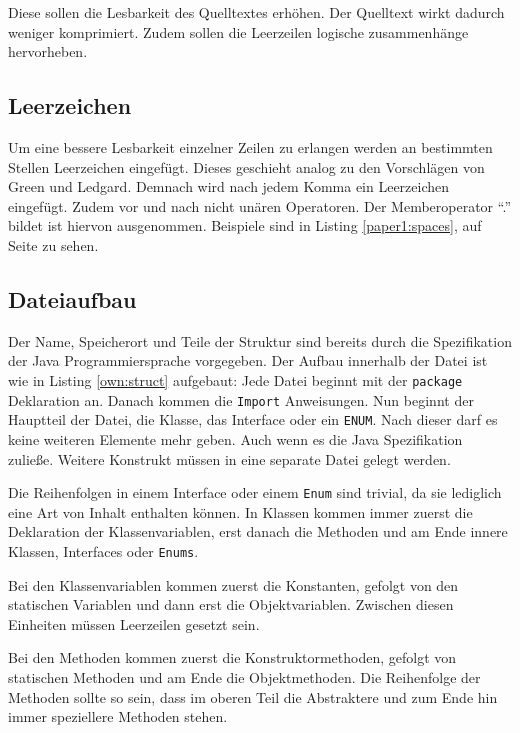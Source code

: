 Diese sollen die Lesbarkeit des Quelltextes erhöhen. Der Quelltext wirkt dadurch weniger komprimiert. Zudem sollen die Leerzeilen logische zusammenhänge hervorheben.

\subsection{Leerzeichen}

Um eine bessere Lesbarkeit einzelner Zeilen zu erlangen werden an bestimmten Stellen Leerzeichen eingefügt. Dieses geschieht analog zu den Vorschlägen von Green und Ledgard\cite[S. 7]{Green}. Demnach wird nach jedem Komma ein Leerzeichen eingefügt. Zudem vor und nach nicht unären Operatoren. Der Memberoperator \enquote{.} bildet ist hiervon ausgenommen. Beispiele sind in Listing \ref{paper1:spaces}, auf Seite \pageref{paper1:spaces} zu sehen.

\subsection{Dateiaufbau}
Der Name, Speicherort und Teile der Struktur sind bereits durch die Spezifikation der Java Programmiersprache vorgegeben. Der Aufbau innerhalb der Datei ist wie in Listing \ref{own:struct}  aufgebaut: Jede Datei beginnt mit der \texttt{package} Deklaration an. Danach kommen die \texttt{Import} Anweisungen. Nun beginnt der Hauptteil der Datei, die Klasse, das Interface oder ein \texttt{ENUM}. Nach dieser darf es keine weiteren Elemente mehr geben. Auch wenn es die Java Spezifikation zuließe. Weitere Konstrukt müssen in eine separate Datei gelegt werden.

Die Reihenfolgen in einem Interface oder einem \texttt{Enum} sind trivial, da sie lediglich eine Art von Inhalt enthalten können. In Klassen kommen immer zuerst die Deklaration der Klassenvariablen, erst danach die Methoden und am Ende innere Klassen, Interfaces oder \texttt{Enums}.

Bei den Klassenvariablen kommen zuerst die Konstanten, gefolgt von den statischen Variablen und dann erst die Objektvariablen. Zwischen diesen Einheiten müssen Leerzeilen gesetzt sein.

Bei den Methoden kommen zuerst die Konstruktormethoden, gefolgt von statischen Methoden und am Ende die Objektmethoden. Die Reihenfolge der Methoden sollte so sein, dass im oberen Teil die Abstraktere und zum Ende hin immer speziellere Methoden stehen.

